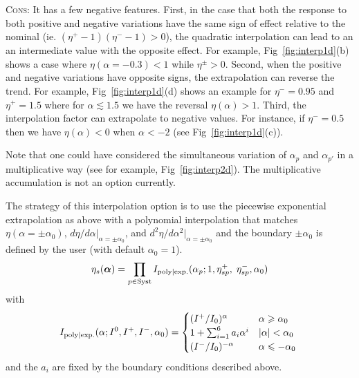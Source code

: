 \textsc{Cons:} It has a few negative features.  First, in the case that both the response to both positive and negative variations have the same sign of effect relative to the nominal (ie. $(\eta^+ -1)(\eta^- -1)>0$), the quadratic interpolation can lead to an an intermediate value with the opposite effect.  For example,  Fig~\ref{fig:interp1d}(b) shows a case where $\eta(\alpha=-0.3)<1$ while $\eta^\pm>0$.  Second, when the positive and negative variations have opposite signs, the extrapolation can reverse the trend.  For example, Fig~\ref{fig:interp1d}(d) shows an example for $\eta^-=0.95$ and $\eta^+=1.5$ where for $\alpha\lesssim 1.5$ we have the reversal $\eta(\alpha)>1$. Third, the interpolation factor can extrapolate to negative values.  For instance, if $\eta^-=0.5$ then  we have $\eta(\alpha)<0$  when $\alpha<-2$  (see Fig~\ref{fig:interp1d}(c)).  

Note that one could have considered the simultaneous variation of $\alpha_{p}$ and $\alpha_{p'}$ in a multiplicative way (see for example, Fig~\ref{fig:interp2d}).  The multiplicative accumulation is not an option currently.


The strategy of this interpolation option is to use the piecewise exponential extrapolation as above with a polynomial interpolation that matches $\eta(\alpha=\pm\alpha_0)$, $d\eta/d\alpha |_{\alpha=\pm\alpha_0}$, and $d^2\eta/d\alpha^2 |_{\alpha=\pm\alpha_0}$ and the boundary $\pm\alpha_0$ is defined by the user (with default $\alpha_0=1$).  
\begin{equation}
\eta_s ({\boldsymbol \alpha}) = \prod_{p\in\textrm{Syst}} I_{\rm poly|exp.}(\alpha_p; 1,\eta_{sp}^+, \; \eta_{sp}^- , \alpha_0) 
\end{equation}
with
\begin{equation}
 I_{\rm poly|exp.}(\alpha;  I^0, I^+,I^- , \alpha_0) =
 \begin{cases}
      (I^+/I_0)^ \alpha  &  \text{$\alpha\ge \alpha_0$} \\
     1+\sum_{i=1}^6 a_i \alpha^i  &  \text{$|\alpha|< \alpha_0$} \\
      (I^-/I_0)^{-\alpha}  &  \text{$\alpha\le-\alpha_0$ }
 \end{cases}
\end{equation}
and the $a_i$ are fixed by the boundary conditions described above.

